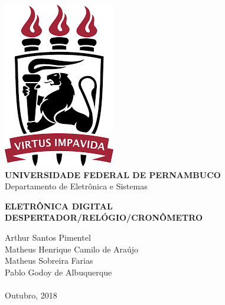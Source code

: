 \documentclass[14pt, oneside]{book}
\date{\vspace{-5ex}}
\theoremstyle{definition}
\begin{document}

    \begin{titlepage}
        \centering 
        \includegraphics[scale = 0.8]{ufpe.png} \\
        \Large{\textbf{UNIVERSIDADE FEDERAL DE PERNAMBUCO}}\\
        \large{Departamento de Eletrônica e Sistemas}
   
        \Huge\textbf{ELETRÔNICA DIGITAL}\\
        \Large\textbf{DESPERTADOR/RELÓGIO/CRONÔMETRO}
   
        \vfill
        \Large{Arthur Santos Pimentel} \\
        \Large{Matheus Henrique Camilo de Araújo} \\
        \Large{Matheus Sobreira Farias} \\
        \Large{Pablo Godoy de Albuquerque}
        \\~\\
        \Large{Outubro, 2018}
    \end{titlepage}

\tableofcontents
\mainmatter
\end{document}
